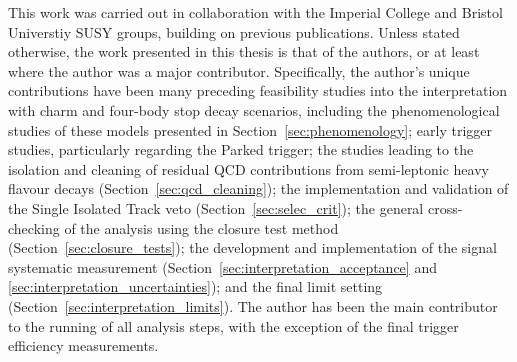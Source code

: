 

\begin{contribution}
\label{sec:contribution}
This work was carried out in collaboration
with the Imperial College and Bristol Universtiy SUSY groups, building on previous
publications. Unless stated otherwise, the work presented in this thesis is that
of the authors, or at least where the author was a major contributor. Specifically,
the author's unique contributions have been many preceding feasibility studies 
into the interpretation with charm
and four-body stop decay scenarios, including the phenomenological studies of these
models presented in Section~\ref{sec:phenomenology}; early trigger studies, particularly
regarding the Parked trigger; the studies leading to the
isolation and cleaning of residual QCD contributions from semi-leptonic heavy flavour
decays (Section~\ref{sec:qcd_cleaning}); the implementation and validation of the Single
Isolated Track veto (Section~\ref{sec:selec_crit}); the general cross-checking of the analysis
using the closure test method (Section~\ref{sec:closure_tests}); the
development and implementation of the signal systematic measurement (Section~\ref{sec:interpretation_acceptance} and
\ref{sec:interpretation_uncertainties}); and the final
limit setting (Section~\ref{sec:interpretation_limits}). The author has been the
main contributor to the running of all analysis steps, with the exception of the
final trigger efficiency measurements.

\end{contribution}